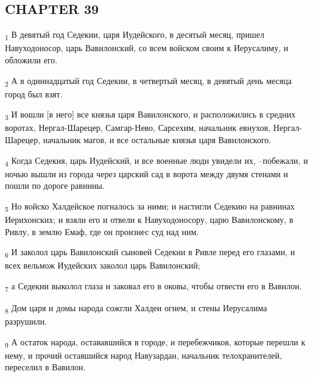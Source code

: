 \subsection{CHAPTER 39}
\begin{tcolorbox}
\textsubscript{1} В девятый год Седекии, царя Иудейского, в десятый месяц, пришел Навуходоносор, царь Вавилонский, со всем войском своим к Иерусалиму, и обложили его.
\end{tcolorbox}
\begin{tcolorbox}
\textsubscript{2} А в одиннадцатый год Седекии, в четвертый месяц, в девятый день месяца город был взят.
\end{tcolorbox}
\begin{tcolorbox}
\textsubscript{3} И вошли [в него] все князья царя Вавилонского, и расположились в средних воротах, Нергал-Шарецер, Самгар-Нево, Сарсехим, начальник евнухов, Нергал-Шарецер, начальник магов, и все остальные князья царя Вавилонского.
\end{tcolorbox}
\begin{tcolorbox}
\textsubscript{4} Когда Седекия, царь Иудейский, и все военные люди увидели их, --побежали, и ночью вышли из города через царский сад в ворота между двумя стенами и пошли по дороге равнины.
\end{tcolorbox}
\begin{tcolorbox}
\textsubscript{5} Но войско Халдейское погналось за ними; и настигли Седекию на равнинах Иерихонских; и взяли его и отвели к Навуходоносору, царю Вавилонскому, в Ривлу, в землю Емаф, где он произнес суд над ним.
\end{tcolorbox}
\begin{tcolorbox}
\textsubscript{6} И заколол царь Вавилонский сыновей Седекии в Ривле перед его глазами, и всех вельмож Иудейских заколол царь Вавилонский;
\end{tcolorbox}
\begin{tcolorbox}
\textsubscript{7} а Седекии выколол глаза и заковал его в оковы, чтобы отвести его в Вавилон.
\end{tcolorbox}
\begin{tcolorbox}
\textsubscript{8} Дом царя и домы народа сожгли Халдеи огнем, и стены Иерусалима разрушили.
\end{tcolorbox}
\begin{tcolorbox}
\textsubscript{9} А остаток народа, остававшийся в городе, и перебежчиков, которые перешли к нему, и прочий оставшийся народ Навузардан, начальник телохранителей, переселил в Вавилон.
\end{tcolorbox}
